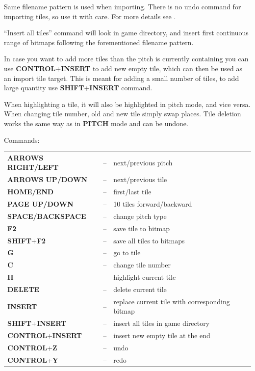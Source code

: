\documentclass[a4paper,12pt]{article}
\begin{document}
Same filename pattern is used when importing. There is no undo command for importing tiles, so use it with care. For more details see .

``Insert all tiles'' command will look in game directory, and insert first continuous range of bitmaps following the forementioned filename pattern.

In case you want to add more tiles than the pitch is currently containing you can use {\bf CONTROL}+{\bf INSERT} to add new empty tile, which can then be used as an import tile target. This is meant for adding a small number of tiles, to add large quantity use {\bf SHIFT}+{\bf INSERT} command.

When highlighting a tile, it will also be highlighted in pitch mode, and vice versa. When changing tile number, old and new tile simply swap places. Tile deletion works the same way as in {\bf PITCH} mode and can be undone.

\vspace{\baselineskip}

\noindent Commands:

\vspace{\baselineskip}

\begin{tabular}{lll}
{\bf ARROWS RIGHT/LEFT} &--& next/previous pitch\\
{\bf ARROWS UP/DOWN}    &--& next/previous tile\\
{\bf HOME/END}          &--& first/last tile\\
{\bf PAGE UP/DOWN}      &--& 10 tiles forward/backward\\
{\bf SPACE/BACKSPACE}   &--& change pitch type\\
{\bf F2}                &--& save tile to bitmap\\
{\bf SHIFT}+{\bf F2}    &--& save all tiles to bitmaps\\
{\bf G}                 &--& go to tile\\
{\bf C}                 &--& change tile number\\
{\bf H}                 &--& highlight current tile\\
{\bf DELETE}            &--& delete current tile\\
{\bf INSERT}            &--& replace current tile with corresponding bitmap\\
{\bf SHIFT}+{\bf INSERT} &--& insert all tiles in game directory\\    
{\bf CONTROL}+{\bf INSERT} &--& insert new empty tile at the end\\
{\bf CONTROL}+{\bf Z} &--& undo\\
{\bf CONTROL}+{\bf Y} &--& redo\\
\end{tabular}
\end{document}
